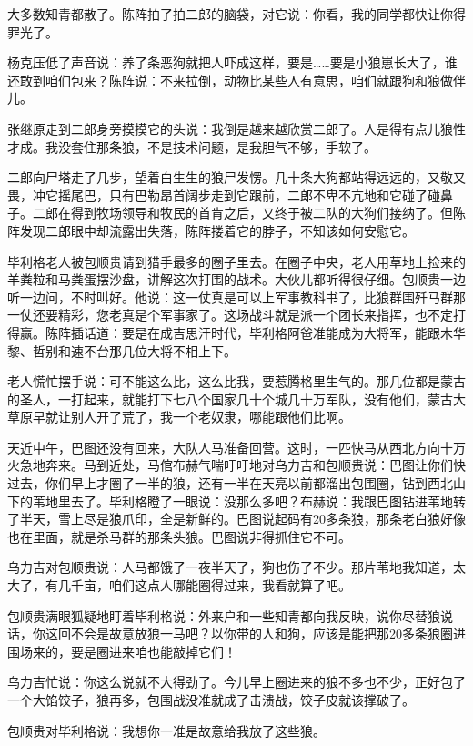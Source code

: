 \par 大多数知青都散了。陈阵拍了拍二郎的脑袋，对它说：你看，我的同学都快让你得罪光了。
\par 杨克压低了声音说：养了条恶狗就把人吓成这样，要是……要是小狼崽长大了，谁还敢到咱们包来？陈阵说：不来拉倒，动物比某些人有意思，咱们就跟狗和狼做伴儿。
\par 张继原走到二郎身旁摸摸它的头说：我倒是越来越欣赏二郎了。人是得有点儿狼性才成。我没套住那条狼，不是技术问题，是我胆气不够，手软了。
\par 二郎向尸塔走了几步，望着白生生的狼尸发愣。几十条大狗都站得远远的，又敬又畏，冲它摇尾巴，只有巴勒昂首阔步走到它跟前，二郎不卑不亢地和它碰了碰鼻子。二郎在得到牧场领导和牧民的首肯之后，又终于被二队的大狗们接纳了。但陈阵发现二郎眼中却流露出失落，陈阵搂着它的脖子，不知该如何安慰它。
\par 
\par 毕利格老人被包顺贵请到猎手最多的圈子里去。在圈子中央，老人用草地上捡来的羊粪粒和马粪蛋摆沙盘，讲解这次打围的战术。大伙儿都听得很仔细。包顺贵一边听一边问，不时叫好。他说：这一仗真是可以上军事教科书了，比狼群围歼马群那一仗还要精彩，您老真是个军事家了。这场战斗就是派一个团长来指挥，也不定打得赢。陈阵插话道：要是在成吉思汗时代，毕利格阿爸准能成为大将军，能跟木华黎、哲别和速不台那几位大将不相上下。
\par 老人慌忙摆手说：可不能这么比，这么比我，要惹腾格里生气的。那几位都是蒙古的圣人，一打起来，就能打下七八个国家几十个城几十万军队，没有他们，蒙古大草原早就让别人开了荒了，我一个老奴隶，哪能跟他们比啊。
\par 天近中午，巴图还没有回来，大队人马准备回营。这时，一匹快马从西北方向十万火急地奔来。马到近处，马倌布赫气喘吁吁地对乌力吉和包顺贵说：巴图让你们快过去，你们早上才圈了一半的狼，还有一半在天亮以前都溜出包围圈，钻到西北山下的苇地里去了。毕利格瞪了一眼说：没那么多吧？布赫说：我跟巴图钻进苇地转了半天，雪上尽是狼爪印，全是新鲜的。巴图说起码有20多条狼，那条老白狼好像也在里面，就是杀马群的那条头狼。巴图说非得抓住它不可。
\par 乌力吉对包顺贵说：人马都饿了一夜半天了，狗也伤了不少。那片苇地我知道，太大了，有几千亩，咱们这点人哪能圈得过来，我看就算了吧。
\par 包顺贵满眼狐疑地盯着毕利格说：外来户和一些知青都向我反映，说你尽替狼说话，你这回不会是故意放狼一马吧？以你带的人和狗，应该是能把那20多条狼圈进围场来的，要是圈进来咱也能敲掉它们！
\par 乌力吉忙说：你这么说就不大得劲了。今儿早上圈进来的狼不多也不少，正好包了一个大馅饺子，狼再多，包围战没准就成了击溃战，饺子皮就该撑破了。
\par 包顺贵对毕利格说：我想你一准是故意给我放了这些狼。
